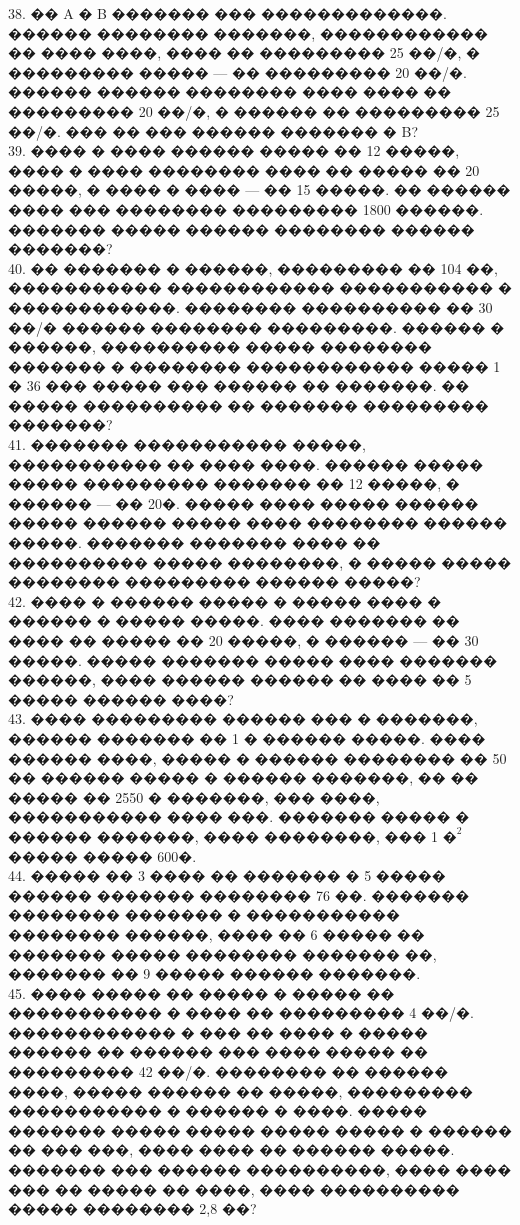 \documentclass[12pt]{article}
\begin{document}
38. �� A � B ������� ��� �������������. ������ �������� �������, ������������ �� ���� ����, ���� �� ��������� 25 ��/�, � ��������� ����� --- �� ��������� 20 ��/�. ������ ������ �������� ���� ���� �� ��������� 20 ��/�, � ������ �� ��������� 25 ��/�. ��� �� ��� ������ ������� � B?\\
39. ���� � ���� ������ ����� �� 12 �����, ���� � ���� �������� ���� �� ����� �� 20 �����, � ���� � ���� --- �� 15 �����. �� ������ ���� ��� �������� ��������� 1800 ������. ������� ����� ������ �������� ������ �������?\\
40. �� ������� � ������, ��������� �� 104 ��, ����������� ������������ ����������� � ������������. �������� ���������� �� 30 ��/� ������ �������� ���������. ������ � ������, ���������� ����� �������� ������� � �������� ������������ ����� 1 � 36 ��� ����� ��� ������ �� �������. �� ����� ���������� �� ������� ��������� �������?\\
41. ������� ����������� �����, ����������� �� ���� ����. ������ ����� ����� ��������� ������� �� 12 �����, � ������ --- �� 20�. ����� ���� ����� ������ ����� ������ ����� ���� �������� ������ �����. ������� ������� ���� �� ���������� ����� ��������, � ����� ����� �������� ��������� ������ �����?\\
42. ���� � ������ ����� � ����� ���� � ������ � ����� �����. ���� ������� �� ���� �� ����� �� 20 �����, � ������ --- �� 30 �����. ����� ������� ����� ���� ������� ������, ���� ������ ������ �� ���� �� 5 ����� ������ ����?\\
43. ���� ��������� ������ ��� � �������, ������ ������� �� 1 � ������ �����. ���� ������ ����, ����� � ������ �������� �� 50 �� ������ ����� � ������ �������, �� �� ����� �� 2550 � �������, ��� ����, ����������� ���� ���. ������� ����� � ������ �������, ���� ��������, ��� 1 $\text{�}^2$ ����� ����� 600�.\\
44. ����� �� 3 ���� �� ������� � 5 ����� ������ ������� �������� 76 ��. ������� �������� ������� � ����������� �������� ������, ���� �� 6 ����� �� ������� ����� �������� ������� ��, ������� �� 9 ����� ������ �������.\\
45. ���� ����� �� ����� � ����� �� ����������� � ���� �� ��������� 4 ��/�. ������������ � ��� �� ���� � ����� ������ �� ������ ��� ���� ����� �� ��������� 42 ��/�. �������� �� ������ ����, ����� ������ �� �����, ��������� ����������� � ������ � ����. ����� ������� ����� ����� ����� ����� � ������ �� ��� ���, ���� ���� �� ������ �����. ������� ��� ������ ����������, ���� ���� ��� �� ����� �� ����, ���� ���������� ����� �������� 2,8 ��?\\
\end{document}
